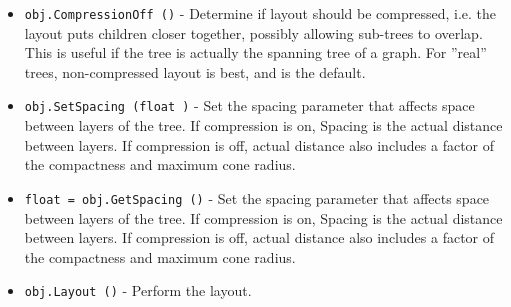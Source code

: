 \begin{itemize}
\item  \verb|obj.CompressionOff ()| -  Determine if layout should be compressed, i.e. the 
 layout puts children closer together, possibly allowing
 sub-trees to overlap.  This is useful if the tree is 
 actually the spanning tree of a graph.  For ''real'' trees, 
 non-compressed layout is best, and is the default.

\item  \verb|obj.SetSpacing (float )| -  Set the spacing parameter that affects space between
 layers of the tree.  If compression is on, Spacing is the
 actual distance between layers.  If compression is off, 
 actual distance also includes a factor of the compactness
 and maximum cone radius.

\item  \verb|float = obj.GetSpacing ()| -  Set the spacing parameter that affects space between
 layers of the tree.  If compression is on, Spacing is the
 actual distance between layers.  If compression is off, 
 actual distance also includes a factor of the compactness
 and maximum cone radius.

\item  \verb|obj.Layout ()| -  Perform the layout.

\end{itemize}
